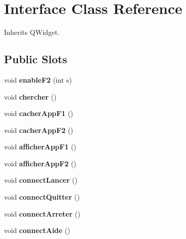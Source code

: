 \hypertarget{class_interface}{}\section{Interface Class Reference}
\label{class_interface}


Inherits Q\+Widget.

\subsection*{Public Slots}
\begin{DoxyCompactItemize}
\item 
\mbox{\label{class_interface_ae3fb6f273993f8207b2418b68936d873}} 
void {\bfseries enable\+F2} (int s)
\item 
\mbox{\label{class_interface_a3b03a85d7a8dce0bffef8d793c0f2195}} 
void {\bfseries chercher} ()
\item 
\mbox{\label{class_interface_a80a1e37847e43306b94bf53496669e3b}} 
void {\bfseries cacher\+App\+F1} ()
\item 
\mbox{\label{class_interface_ae35b4de3ed5d1433ca4950891fd48fab}} 
void {\bfseries cacher\+App\+F2} ()
\item 
\mbox{\label{class_interface_a5f0bd803004e90b825dd4b22ccf66890}} 
void {\bfseries afficher\+App\+F1} ()
\item 
\mbox{\label{class_interface_ad52e9863e8e9f3e496780f67d18f07a7}} 
void {\bfseries afficher\+App\+F2} ()
\item 
\mbox{\label{class_interface_a0e2f245c0c3c924503a70bd9325e746d}} 
void {\bfseries connect\+Lancer} ()
\item 
\mbox{\label{class_interface_a303469419b33103af1a14589ad02f2ef}} 
void {\bfseries connect\+Quitter} ()
\item 
\mbox{\label{class_interface_adeffb11a443b9996cdf5fd20fdab2aa7}} 
void {\bfseries connect\+Arreter} ()
\item 
\mbox{\label{class_interface_a9633135a56d6c960b17702c9021dfc6c}} 
void {\bfseries connect\+Aide} ()
\end{DoxyCompactItemize}
